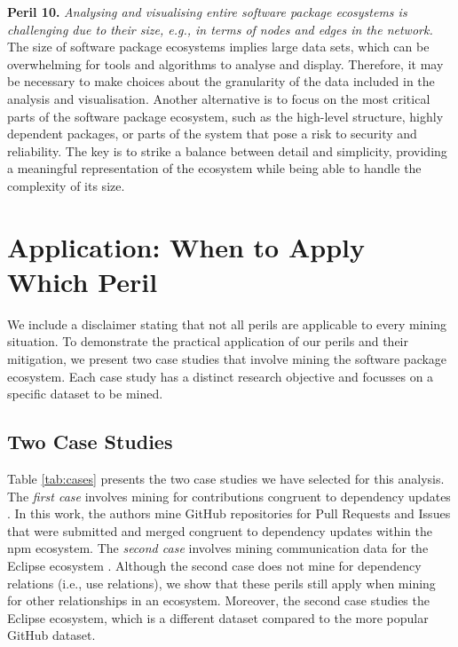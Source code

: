 \textbf{Peril 10.}\textit{
Analysing and visualising entire software package ecosystems is challenging due to their size, e.g., in terms of nodes and edges in the network.
}\\

The size of software package ecosystems implies large data sets, which can be overwhelming for tools and algorithms to analyse and display. Therefore, it may be necessary to make choices about the granularity of the data included in the analysis and visualisation. Another alternative is to focus on the most critical parts of the software package ecosystem, such as the high-level structure, highly dependent packages, or parts of the system that pose a risk to security and reliability. 
The key is to strike a balance between detail and simplicity, providing a meaningful representation of the ecosystem while being able to handle the complexity of its size.


\section{Application: When to Apply Which Peril}
\label{PPM:sec:application}

We include a disclaimer stating that not all perils are applicable to every mining situation. To demonstrate the practical application of our perils and their mitigation, we present two case studies that involve mining the software package ecosystem. Each case study has a distinct research objective and focusses on a specific dataset to be mined.

\subsection{Two Case Studies}
Table \ref{tab:cases} presents the two case studies we have selected for this analysis.
The \textit{first case} involves mining for contributions congruent to dependency updates \cite{wattanakriengkrai2022giving}. 
In this work, the authors mine GitHub repositories for Pull Requests and Issues that were submitted and merged congruent to dependency updates within the npm ecosystem. 
The \textit{second case} involves mining communication data for the Eclipse ecosystem \cite{Nugroho2021}. Although the second case does not mine for dependency relations (i.e., use relations),  we show that these perils still apply when mining for other relationships in an ecosystem.
Moreover, the second case studies the Eclipse ecosystem, which is a different dataset compared to the more popular GitHub dataset.

